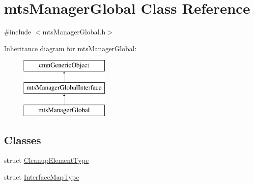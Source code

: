 \hypertarget{classmts_manager_global}{\section{mts\-Manager\-Global Class Reference}
\label{classmts_manager_global}
}


{\ttfamily \#include $<$mts\-Manager\-Global.\-h$>$}

Inheritance diagram for mts\-Manager\-Global\-:\begin{figure}[H]
\begin{center}
\leavevmode
\includegraphics[height=3.000000cm]{d1/d06/classmts_manager_global}
\end{center}
\end{figure}
\subsection*{Classes}
\begin{DoxyCompactItemize}
\item 
struct \hyperlink{structmts_manager_global_1_1_cleanup_element_type}{Cleanup\-Element\-Type}
\item 
struct \hyperlink{structmts_manager_global_1_1_interface_map_type}{Interface\-Map\-Type}
\end{DoxyCompactItemize}
